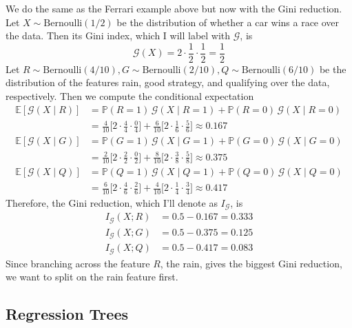   \begin{example}
    We do the same as the Ferrari example above but now with the Gini reduction. Let $X \sim \mathrm{Bernoulli}(1/2)$ be the distribution of whether a car wins a race over the data. Then its Gini index, which I will label with $\mathcal{G}$, is \[\mathcal{G} (X) = 2 \cdot \frac{1}{2} \cdot \frac{1}{2} = \frac{1}{2}\]
    Let $R \sim \mathrm{Bernoulli}(4/10), G \sim \mathrm{Bernoulli}(2/10), Q \sim \mathrm{Bernoulli}(6/10)$ be the distribution of the features rain, good strategy, and qualifying over the data, respectively. Then we compute the conditional expectation 
    \begin{align*}
        \mathbb{E}[\mathcal{G}(X \mid R)] & = \mathbb{P}(R = 1)\, \mathcal{G}(X \mid R = 1) + \mathbb{P}(R = 0) \, \mathcal{G}(X \mid R = 0) \\ 
        & = \frac{4}{10} \bigg[ 2 \cdot \frac{4}{4} \cdot \frac{0}{4} \bigg] + \frac{6}{10} \bigg[ 2 \cdot \frac{1}{6} \cdot \frac{5}{6} \bigg] \approx 0.167 \\
        \mathbb{E}[\mathcal{G}(X \mid G)] & = \mathbb{P}(G = 1)\, \mathcal{G}(X \mid G = 1) + \mathbb{P}(G = 0) \, \mathcal{G}(X \mid G = 0) \\ 
        & = \frac{2}{10} \bigg[ 2 \cdot \frac{2}{2} \cdot \frac{0}{2} \bigg] + \frac{8}{10} \bigg[ 2 \cdot \frac{3}{8} \cdot \frac{5}{8} \bigg] \approx 0.375 \\
        \mathbb{E}[\mathcal{G}(X \mid Q)] & = \mathbb{P}(Q = 1)\, \mathcal{G}(X \mid Q = 1) + \mathbb{P}(Q = 0) \, \mathcal{G}(X \mid Q = 0) \\ 
        & = \frac{6}{10} \bigg[ 2 \cdot \frac{4}{6} \cdot \frac{2}{6} \bigg] + \frac{4}{10} \bigg[ 2 \cdot \frac{1}{4} \cdot \frac{3}{4} \bigg] \approx 0.417
    \end{align*}
    Therefore, the Gini reduction, which I'll denote as $I_{\mathcal{G}}$, is 
    \begin{align*}
        I_{\mathcal{G}} (X ; R) & = 0.5 - 0.167 = 0.333 \\
        I_{\mathcal{G}} (X ; G) & = 0.5 - 0.375 = 0.125 \\
        I_{\mathcal{G}} (X ; Q) & = 0.5 - 0.417 = 0.083
    \end{align*}
    Since branching across the feature $R$, the rain, gives the biggest Gini reduction, we want to split on the rain feature first. 
  \end{example}

\subsection{Regression Trees}

